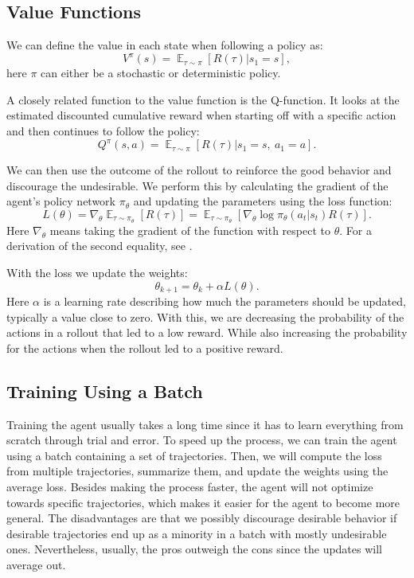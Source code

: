 \documentclass[12pt,A4]{report}
\theoremstyle{definition}
\begin{document}
\subsection{Value Functions}

We can define the value in each state when following a policy as:
\[ V^\pi(s) = \mathop{\mathbb{E}}_{\tau \sim \pi} [R(\tau) | s_1 = s],\]
here $\pi$ can either be a stochastic or deterministic policy.

A closely related function to the value function is the Q-function. It looks at the estimated discounted cumulative reward when starting off with a specific action and then continues to follow the policy:
\[ Q^\pi(s, a) = \mathop{\mathbb{E}}_{\tau \sim \pi} [R(\tau) | s_1 = s, \ a_1 = a].\]

We can then use the outcome of the rollout to reinforce the good behavior and discourage the undesirable. We perform this by calculating the gradient of the agent's policy network $\pi_\theta$ and updating the parameters using the loss function:
\[ L(\theta) = \nabla_\theta \mathop{\mathbb{E}}_{\tau \sim \pi_\theta}[R(\tau)] = \mathop{\mathbb{E}}_{\tau \sim \pi_\theta} [\nabla_\theta \log \pi_\theta (a_t|s_t) R(\tau) ]. \]
Here $\nabla_\theta$ means taking the gradient of the function with respect to $\theta$. For a derivation of the second equality, see \citet{OpenAI}. 

With the loss we update the weights:
\[ \theta_{k+1} = \theta_k + \alpha L(\theta).\]
Here $\alpha$ is a learning rate describing how much the parameters should be updated, typically a value close to zero. With this, we are decreasing the probability of the actions in a rollout that led to a low reward. While also increasing the probability for the actions when the rollout led to a positive reward.

\subsection{Training Using a Batch}

Training the agent usually takes a long time since it has to learn everything from scratch through trial and error. To speed up the process, we can train the agent using a batch containing a set of trajectories. Then, we will compute the loss from multiple trajectories, summarize them, and update the weights using the average loss. Besides making the process faster, the agent will not optimize towards specific trajectories, which makes it easier for the agent to become more general. The disadvantages are that we possibly discourage desirable behavior if desirable trajectories end up as a minority in a batch with mostly undesirable ones. Nevertheless, usually, the pros outweigh the cons since the updates will average out.
\end{document}
